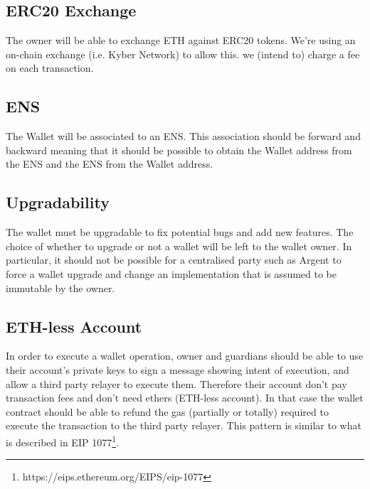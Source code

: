 \documentclass[12pt]{article}
\begin{document}
\subsection{ERC20 Exchange}

The owner will be able to exchange ETH against ERC20 tokens. We're using an on-chain exchange (i.e. Kyber Network) to allow this. we (intend to) charge a fee on each transaction.

\subsection{ENS}

The Wallet will be associated to an ENS. This association should be forward and backward meaning that it should be possible to obtain the Wallet address from the ENS and the ENS from the Wallet address.

\subsection{Upgradability}

The wallet must be upgradable to fix potential bugs and add new features. The choice of whether to upgrade or not a wallet will be left to the wallet owner. In particular, it should not be possible for a centralised party such as Argent to force a wallet upgrade and change an implementation that is assumed to be immutable by the owner.

\subsection{ETH-less Account}
\label{sec:eth-less-account}

In order to execute a wallet operation, owner and guardians should be able to use their account's private keys to sign a message showing intent of execution, and allow a third party relayer to execute them. Therefore their account don't pay transaction fees and don't need ethers (ETH-less account). In that case the wallet contract should be able to refund the gas (partially or totally) required to execute the transaction to the third party relayer. This pattern is similar to what is described in EIP 1077\footnote{https://eips.ethereum.org/EIPS/eip-1077}.
\end{document}
